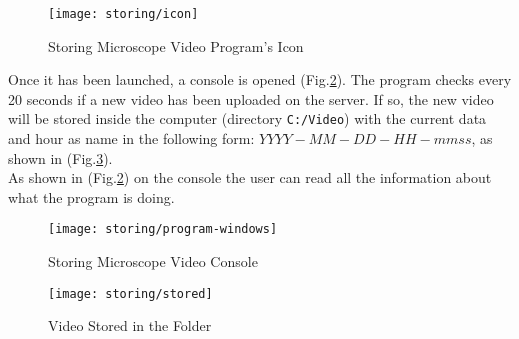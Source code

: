 \begin{figure}[h]
	\begin{center}
		\texttt{[image: storing/icon]}
		\caption{Storing Microscope Video Program's Icon}
		\label{Fig:icostoring}
	\end{center}
\end{figure}

Once it has been launched, a console is opened (Fig.\ref{Fig:storingwindows}). The program checks every 20 seconds if a new video has been uploaded on the server. If so, the new video will be stored inside the computer (directory \texttt{C:/Video}) with the current data and hour as name in the following form: $YYYY-MM-DD-HH-mmss$, as shown in (Fig.\ref{Fig:stored}).\\

As shown in (Fig.\ref{Fig:storingwindows}) on the console the user can read all the information about what the program is doing.

\begin{figure}[h]
	\begin{center}
		\texttt{[image: storing/program-windows]}
		\caption{Storing Microscope Video Console}
		\label{Fig:storingwindows}
	\end{center}
\end{figure}

\begin{figure}[h]
	\begin{center}
		\texttt{[image: storing/stored]}
		\caption{Video Stored in the Folder}
		\label{Fig:stored}
	\end{center}
\end{figure}
 
 
